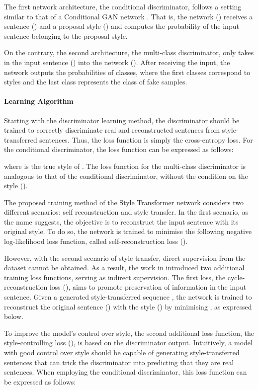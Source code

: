 \documentclass[acmsmall]{acmart}
\begin{document}
The first network architecture, the conditional discriminator, follows a setting similar to that of a Conditional GAN network \cite{cond-gan}. That is, the network () receives a sentence () and a proposal style () and computes the probability of the input sentence belonging to the proposal style.

On the contrary, the second architecture, the multi-class discriminator, only takes in the input sentence () into the network (). After receiving the input, the network outputs the probabilities of  classes, where the first  classes correspond to  styles and the last class represents the class of fake samples.

\paragraph{Learning Algorithm} Starting with the discriminator learning method, the discriminator should be trained to correctly discriminate real and reconstructed sentences from style-transferred sentences. Thus, the loss function is simply the cross-entropy loss. For the conditional discriminator, the loss function can be expressed as follows:


where  is the true style of . The loss function for the multi-class discriminator is analogous to that of the conditional discriminator, without the condition on the style ().


The proposed training method of the Style Transformer network considers two different scenarios: self reconstruction and style transfer. In the first scenario, as the name suggests, the objective is to reconstruct the input sentence with its original style. To do so, the network is trained to minimise the following negative log-likelihood loss function, called self-reconstruction loss ().


However, with the second scenario of style transfer, direct supervision from the dataset cannot be obtained. As a result, the work in \cite{style-transformer} introduced two additional training loss functions, serving as indirect supervision. The first loss, the cycle-reconstruction loss (), aims to promote preservation of information in the input sentence. Given a generated style-transferred sequence , the network is trained to reconstruct the original sentence () with the style () by minimising , as expressed below.


To improve the model's control over style, the second additional loss function, the style-controlling loss (), is based on the discriminator output. Intuitively, a model with good control over style should be capable of generating style-transferred sentences that can trick the discriminator into predicting that they are real sentences. When employing the conditional discriminator, this loss function can be expressed as follows:
\end{document}
